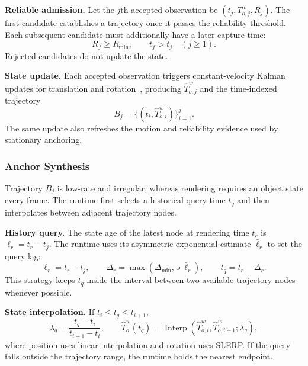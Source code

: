 \documentclass[review]{vgtc}
\begin{document}
\textbf{Reliable admission.} Let the $j$th accepted observation be $(t_j,T_{o,j}^{w},R_j)$. The first candidate establishes a trajectory once it passes the reliability threshold. Each subsequent candidate must additionally have a later capture time:
\begin{equation}
R_f \geq R_{\min}, \qquad t_f > t_j \quad (j \geq 1).
\label{eq:admission}
\end{equation}
Rejected candidates do not update the state.

\textbf{State update.} Each accepted observation triggers constant-velocity Kalman updates for translation and rotation~\cite{kalman1960new}, producing $\widehat{T}_{o,j}^{w}$ and the time-indexed trajectory
\begin{equation}
B_j = \{(t_i, \widehat{T}_{o,i}^{w})\}_{i=1}^{j}.
\label{eq:trajectory}
\end{equation}
The same update also refreshes the motion and reliability evidence used by stationary anchoring.

\subsubsection{Anchor Synthesis}\label{sec:frame-output}

Trajectory $B_j$ is low-rate and irregular, whereas rendering requires an object state every frame. The runtime first selects a historical query time $t_q$ and then interpolates between adjacent trajectory nodes.

\textbf{History query.} The state age of the latest node at rendering time $t_r$ is $\ell_r=t_r-t_j$. The runtime uses its asymmetric exponential estimate $\bar{\ell}_r$ to set the query lag:
\begin{equation}
\ell_r = t_r - t_j, \qquad \Delta_r = \max(\Delta_{\min},\, s\,\bar{\ell}_r), \qquad t_q = t_r - \Delta_r.
\label{eq:target-time}
\end{equation}
This strategy keeps $t_q$ inside the interval between two available trajectory nodes whenever possible.

\textbf{State interpolation.} If $t_i\leq t_q\leq t_{i+1}$,
\begin{equation}
\lambda_q = \frac{t_q - t_i}{t_{i+1} - t_i}, \qquad \widehat{T}_o^w(t_q) = \operatorname{Interp}(\widehat{T}_{o,i}^{w}, \widehat{T}_{o,i+1}^{w}; \lambda_q),
\label{eq:history-interp}
\end{equation}
where position uses linear interpolation and rotation uses SLERP. If the query falls outside the trajectory range, the runtime holds the nearest endpoint.
\end{document}
